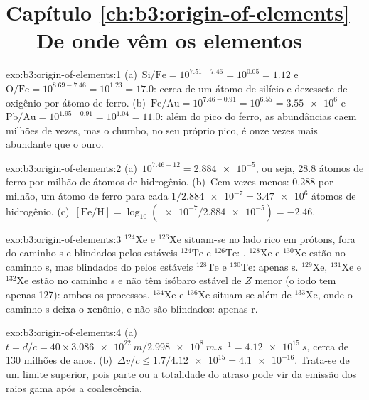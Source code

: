 \section*{Capítulo \ref{ch:b3:origin-of-elements} --- De onde vêm os elementos}

\begin{solution}{exo:b3:origin-of-elements:1}
(a)~$\mathrm{Si/Fe} = 10^{7.51 - 7.46} = 10^{0.05} = 1.12$ e
$\mathrm{O/Fe} = 10^{8.69 - 7.46} = 10^{1.23} = 17.0$: cerca de um
átomo de silício e dezessete de oxigênio por átomo de ferro. (b)~$\mathrm{Fe/Au} =
10^{7.46 - 0.91} = 10^{6.55} = \num{3.55e6}$ e $\mathrm{Pb/Au} =
10^{1.95 - 0.91} = 10^{1.04} = 11.0$: além do pico do ferro, as abundâncias
caem milhões de vezes, mas o chumbo, no seu próprio pico, é
onze vezes mais abundante que o ouro.
\end{solution}

\begin{solution}{exo:b3:origin-of-elements:2}
(a)~$10^{7.46 - 12} = \num{2.884e-5}$, ou seja, \num{28.8} átomos de ferro por
milhão de átomos de hidrogênio. (b)~Cem vezes menos: \num{0.288} por
milhão, um átomo de ferro para cada $1/\num{2.884e-7} = \num{3.47e6}$ átomos de
hidrogênio. (c)~$[\mathrm{Fe/H}] = \log_{10}(\num{e-7}/\num{2.884e-5}) =
-2.46$.
\end{solution}

\begin{solution}{exo:b3:origin-of-elements:3}
$^{124}\mathrm{Xe}$ e $^{126}\mathrm{Xe}$ situam-se no lado rico em prótons,
fora do caminho s e blindados pelos estáveis $^{124}\mathrm{Te}$ e
$^{126}\mathrm{Te}$: . $^{128}\mathrm{Xe}$ e $^{130}\mathrm{Xe}$
estão no caminho s, mas blindados do  pelos estáveis
$^{128}\mathrm{Te}$ e $^{130}\mathrm{Te}$: apenas s. $^{129}\mathrm{Xe}$,
$^{131}\mathrm{Xe}$ e $^{132}\mathrm{Xe}$ estão no caminho s e não têm
isóbaro estável de $Z$ menor (o iodo tem apenas 127): ambos os processos.
$^{134}\mathrm{Xe}$ e $^{136}\mathrm{Xe}$ situam-se além de
$^{133}\mathrm{Xe}$, onde o caminho s deixa o xenônio, e não são
blindados: apenas r.
\end{solution}

\begin{solution}{exo:b3:origin-of-elements:4}
(a)~$t = d/c = 40\times\qty{3.086e22}{m}/\qty{2.998e8}{m.s^{-1}} =
\qty{4.12e15}{s}$, cerca de \num{130} milhões de anos. (b)~$\Delta v/c \le
1.7/\num{4.12e15} = \num{4.1e-16}$. Trata-se de um limite superior, pois parte ou
a totalidade do atraso pode vir da emissão dos raios gama após a
coalescência.
\end{solution}

